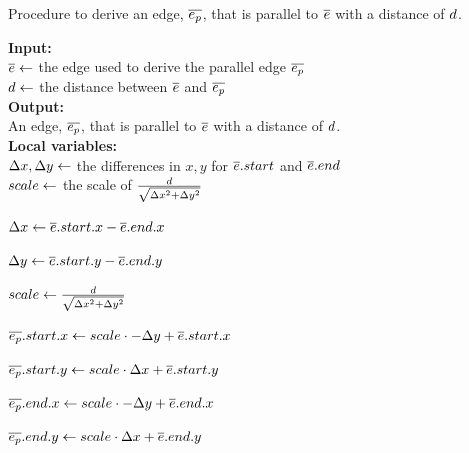 


\begin{algorithm}[tb!]
    \caption{Procedure to derive an edge, $ \EdgeParallel $, that is parallel to $ \protect\overline{e} $ with a distance of $ d $.}\label{alg:derive corridor edge}

    \textbf{Input:} \\
    $ \protect\overline{e} \gets $ the edge used to derive the parallel edge $ \EdgeParallel $ \\
    $ d \gets $ the distance between $ \protect\overline{e} $ and $ \EdgeParallel $ \\

    \textbf{Output:} \\
    An edge, $ \EdgeParallel $, that is parallel to $ \protect\overline{e} $ with a distance of $ d $. \\

    \textbf{Local variables:} \\
    $ \Delta x, \Delta y \gets $ the differences in $ x, y $ for $ \protect\overline{e}.start $ and $ \protect\overline{e}.end $ \\
    $ scale \gets $ the scale of $ \frac{d}{\sqrt{\Delta x^2 + \Delta y^2}} $ \\

    \begin{algorithmic}[1]
            \State $ \Delta x \gets \protect\overline{e}.start.x - \protect\overline{e}.end.x $

            \State $ \Delta y \gets \protect\overline{e}.start.y - \protect\overline{e}.end.y $

            \State $ scale \gets \frac{d}{\sqrt{\Delta x^2 + \Delta y^2}} $

            \State $ \protect\overline{e_p}.start.x \gets scale \cdot -\Delta y + \protect\overline{e}.start.x $

            \State $ \protect\overline{e_p}.start.y \gets scale \cdot \Delta x + \protect\overline{e}.start.y $

            \State $ \protect\overline{e_p}.end.x \gets scale \cdot -\Delta y + \protect\overline{e}.end.x $

            \State $ \protect\overline{e_p}.end.y \gets scale \cdot \Delta x + \protect\overline{e}.end.y $

        \State \Return{$ \EdgeParallel $}

        \EndProcedure

    \end{algorithmic}
\end{algorithm}

